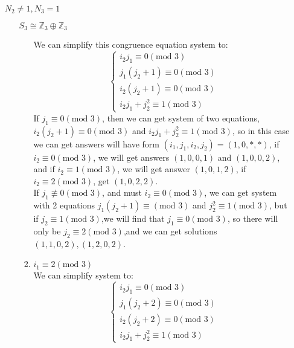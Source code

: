 \documentclass[a4paper,14pt]{article}
\begin{document}
\begin{enumerate}
\begin{item}{$N_2 \neq 1, N_3 = 1$}
\begin{enumerate}
\begin{item}{$S_3\cong \mathbb{Z}_3 \oplus \mathbb{Z}_3$}
\begin{enumerate}
                            We can simplify this congruence equation system to:
                            $$
                            \begin{cases}
                                i_2j_1 \equiv 0 (\text{mod 3})\\
                                j_1(j_2+1) \equiv 0 (\text{mod 3})\\
                                i_2(j_2+1) \equiv 0 (\text{mod 3})\\
                                i_2j_1+ j_2^2  \equiv 1 (\text{mod 3})
                            \end{cases}
                            $$
                            If $j_1 \equiv 0 (\text{mod 3})$, then we can get system of two equations, 
                            $i_2(j_2+1) \equiv 0 (\text{mod 3})$ and
                            $i_2j_1+ j_2^2  \equiv 1 (\text{mod 3})$, so in this case we can get answers will have form $(i_1,j_1,i_2,j_2) = (1,0,*,*)$,
                            if $i_2 \equiv 0 (\text{mod 3})$, we will get answers $(1,0,0,1)$ and $(1,0,0,2)$, and if $i_2 \equiv 1 (\text{mod 3})$,
                            we will get answer $(1,0,1,2)$, if $i_2 \equiv 2 (\text{mod 3})$, get $(1,0,2,2)$.\\
                            If $j_1\not \equiv 0 (\text{mod 3})$, and must $i_2 \equiv 0 (\text{mod 3})$, we can get system with 2 equations
                            $j_1(j_2 + 1) \equiv (\text{mod 3})$ and $j_2^2 \equiv 1 (\text{mod 3})$, but if $j_2 \equiv 1 (\text{mod 3})$,we will
                            find that $j_1 \equiv 0 (\text{mod 3})$, so there will only be $j_2 \equiv 2 (\text{mod 3})$,and 
                            we can get solutions $(1,1,0,2),(1,2,0,2)$.
                        \item $i_1 \equiv 2 (\text{mod 3})$\\
                            We can simplify system to:
                            $$
                            \begin{cases}
                                i_2j_1 \equiv 0 (\text{mod 3})\\
                                j_1(j_2+2) \equiv 0 (\text{mod 3})\\
                                i_2(j_2+2) \equiv 0 (\text{mod 3})\\
                                i_2j_1+ j_2^2  \equiv 1 (\text{mod 3})
                            \end{cases}
                            $$

\end{enumerate}
\end{item}
\end{enumerate}
\end{item}
\end{enumerate}
\end{document}
